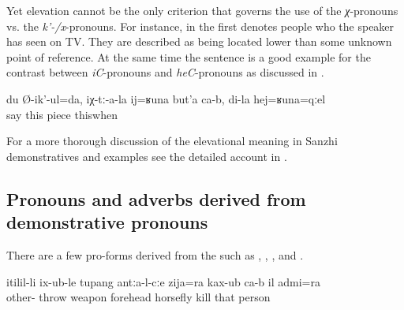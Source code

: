 Yet elevation cannot be the only criterion that governs the use of the \textit{χ}-pronouns vs. the \textit{k'-/x}-pronouns. For instance, in  the first  denotes people who the speaker has seen on TV. They are described as being located lower than some unknown point of reference. At the same time the sentence is a good example for the contrast between \textit{iC}-pronouns and \textit{heC}-pronouns as discussed in . 

\begin{exe}
	\ex	\label{I (masc.) say, they have a (little) piece (of a diamond) like this, while I have one like this}
	\gll	du	Ø-ik'-ul=da,	iχ-tː-a-la	ij=ʁuna	but'a	ca-b,	di-la	hej=ʁuna=qːel \\
			say		this	piece			thiswhen\\
	\glt	{}
\end{exe}

For a more thorough discussion of the elevational meaning in Sanzhi demonstratives and examples see the detailed account in \citet{ForkerLTSanzhi}.

\subsection{Pronouns and adverbs derived from demonstrative pronouns}
\label{ssec:Pronouns and adverbs derived from demonstrative pronouns}

There are a few pro-forms derived from the  such as  ,   ,  , and  .
%
\begin{exe}
	 \label{ex:thehorseflyandtheman}
	\sn
	\gll	itilil-li	ix-ub-le	tupang	antːa-l-cːe	zija=ra	kax-ub	ca-b	il	admi=ra\\
		other-	throw	weapon	forehead horsefly	kill		that	person\\
	\glt	{}
\end{exe}

